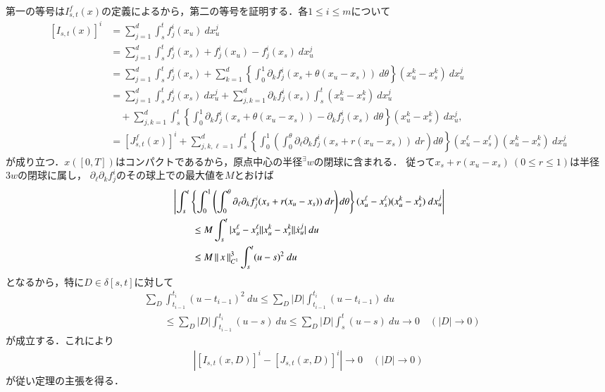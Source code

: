 	\begin{prf}
		第一の等号は$I^f_{s,t}(x)$の定義によるから，第二の等号を証明する．各$1 \leq i \leq m$について
		\begin{align}
			\left[ I_{s,t}(x) \right]^i
			&= \sum_{j=1}^d \int_s^t f_j^i(x_u)\ dx^j_u \\
			&= \sum_{j=1}^d \int_s^t f_j^i(x_s) + f_j^i(x_u) - f_j^i(x_s)\ dx^j_u \\
			&= \sum_{j=1}^d \int_s^t f_j^i(x_s) 
				+ \sum_{k=1}^d  \left\{ \int_0^1 \partial_k f_j^i(x_s + \theta(x_u - x_s))\ d\theta \right\} (x^k_u - x^k_s)\ dx^j_u \\
			&= \sum_{j=1}^d \int_s^t f_j^i(x_s)\ dx^j_u + \sum_{j,k=1}^d \partial_k f_j^i(x_s) \int_s^t (x^k_u - x^k_s)\ dx^j_u \\
				&\quad + \sum_{j,k=1}^d \int_s^t 
				\left\{ \int_0^1 \partial_k f_j^i(x_s + \theta(x_u - x_s)) - \partial_k f_j^i(x_s)\ d\theta \right\} (x^k_u - x^k_s)\ dx^j_u, \\
			&= \left[ J^f_{s,t}(x) \right]^i
				+ \sum_{j,k,\ell=1}^d \int_s^t 
				\left\{ \int_0^1 \left( \int_0^\theta \partial_\ell \partial_k f_j^i(x_s + r(x_u - x_s))\ dr\right) d\theta \right\} (x^\ell_u - x^\ell_s)(x^k_u - x^k_s)\ dx^j_u
		\end{align}
		が成り立つ．$x([0,T])$はコンパクトであるから，原点中心の半径${}^\exists w$の閉球に含まれる．
		従って$x_s + r(x_u - x_s)\ (0 \leq r \leq 1)$は半径$3w$の閉球に属し，
		$\partial_\ell \partial_k f_j^i$のその球上での最大値を$M$とおけば
		\begin{align}
			&\left| \int_s^t 
				\left\{ \int_0^1 \left( \int_0^\theta \partial_\ell \partial_k f_j^i(x_s + r(x_u - x_s))\ dr\right) d\theta \right\} (x^\ell_u - x^\ell_s)(x^k_u - x^k_s)\ dx^j_u \right| \\
			&\qquad \leq M \int_s^t |x^\ell_u - x^\ell_s||x^k_u - x^k_s| |\dot{x}^j_u|\ du \\
			&\qquad \leq M \left\|\, x\, \right\|_{C^1}^3 \int_s^t (u - s)^2\ du
		\end{align}
		となるから，特に$D \in \delta[s,t]$に対して
		\begin{align}
			&\sum_D \int_{t_{i-1}}^{t_i} (u - t_{i-1})^2\ du
			\leq \sum_D |D| \int_{t_{i-1}}^{t_i} (u - t_{i-1})\ du \\
			&\qquad \leq \sum_D |D| \int_{t_{i-1}}^{t_i} (u - s)\ du
			\leq \sum_D |D| \int_{s}^{t} (u - s)\ du
			\longrightarrow 0 \quad (|D| \longrightarrow 0)
		\end{align}
		が成立する．これにより
		\begin{align}
			\left| \left[ I_{s,t}(x,D) \right]^i - \left[ J_{s,t}(x,D) \right]^i \right| \longrightarrow 0 \quad (|D| \longrightarrow 0)
		\end{align}
		が従い定理の主張を得る．
		\QED
	\end{prf}
